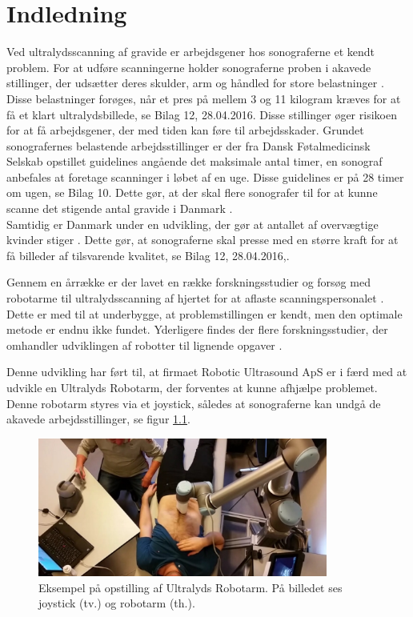 \chapter{Indledning} 
Ved ultralydsscanning af gravide er arbejdsgener hos sonograferne et kendt problem. For at udføre scanningerne holder sonograferne proben i akavede stillinger, der udsætter deres skulder, arm og håndled for store belastninger \cite{1}\cite{24}\cite{31}\cite{32}\cite{36}. Disse belastninger forøges, når et pres på mellem 3 og 11 kilogram kræves for at få et klart ultralydsbillede, se Bilag 12, 28.04.2016. Disse stillinger øger risikoen for at få arbejdsgener, der med tiden kan føre til arbejdsskader. Grundet sonografernes belastende arbejdsstillinger er der fra Dansk Føtalmedicinsk Selskab opstillet guidelines angående det maksimale antal timer, en sonograf anbefales at foretage scanninger i løbet af en uge. Disse guidelines er på 28 timer om ugen, se Bilag 10. Dette gør, at der skal flere sonografer til for at kunne scanne det stigende antal gravide i Danmark \cite{Foedsler}. \\
Samtidig er Danmark under en udvikling, der gør at antallet af overvægtige kvinder stiger \cite{Overvaegt}. Dette gør, at sonograferne skal presse med en større kraft for at få billeder af tilsvarende kvalitet, se Bilag 12, 28.04.2016,\cite{24}\cite{31}\cite{8}. 

Gennem en årrække er der lavet en række forskningsstudier og forsøg med robotarme til ultralydsscanning af hjertet for at aflaste scanningspersonalet \cite{5}. Dette er med til at underbygge, at problemstillingen er kendt, men den optimale metode er endnu ikke fundet. Yderligere findes der flere forskningsstudier, der omhandler udviklingen af robotter til lignende opgaver \cite{8}\cite{5}\cite{18}. 

Denne udvikling har ført til, at firmaet Robotic Ultrasound ApS er i færd med at udvikle en Ultralyds Robotarm, der forventes at kunne afhjælpe problemet. Denne robotarm styres via et joystick, således at sonograferne kan undgå de akavede arbejdsstillinger, se figur \ref{opstilling}.  

\begin{figure}[H]\centering
	\includegraphics[width = 0.85\textwidth]{Figurer/ergonomiskLosning.jpg}
	\caption{Eksempel på opstilling af Ultralyds Robotarm. På billedet ses joystick (tv.) og robotarm (th.).  }
	\label{opstilling}
\end{figure}

